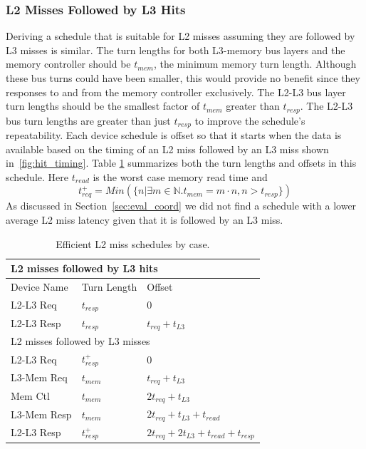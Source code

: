 \subsubsection{L2 Misses Followed by L3 Hits}
Deriving a schedule that is suitable for L2 misses assuming they are followed 
by L3 misses is similar. The turn lengths for both L3-memory bus layers and
the memory controller should be $t_{mem}$, the minimum memory turn length.
Although these bus turns could have been smaller, this would provide no
benefit since they responses to and from the memory controller exclusively.
The L2-L3 bus layer turn lengths should be
the smallest factor of $t_{mem}$ greater than $t_{resp}$. The L2-L3 bus turn 
lengths are greater than just $t_{resp}$ to improve the schedule's repeatability.
Each device schedule is offset so that it starts when the data is available 
based on the timing of an L2 miss followed by an L3 miss shown 
in~\ref{fig:hit_timing}. Table \ref{tab:l2_miss_schedules} summarizes both the
turn lengths and offsets in this schedule. Here $t_{read}$ is the worst case
memory read time and
\[
  t_{req}^+ = Min(\{n | \exists m\in \mathbb{N}.t_{mem}=m\cdot n, n > t_{resp}\})
\]
As discussed in Section~\ref{sec:eval_coord} we did not find a schedule with 
a lower average L2 miss latency given that it is followed by an L3 miss.

\def\dc{Blue}
\begin{table}
    \caption{Efficient L2 miss schedules by case.}
    \begin{small}
    \centering
    \begin{tabular}{|r|r|l|l|}
        \hline
        \multicolumn{4}{|l|}{L2 misses followed by L3 hits}\\\hline
        \multicolumn{2}{|l|}{Device Name} & Turn Length & Offset\\\hline
        \multicolumn{2}{|l|}{L2-L3 Req}  & $t_{resp}$ & 0\\\hline
        \multicolumn{2}{|l|}{L2-L3 Resp} & $t_{resp}$ &
          $t_{req}+t_{L3}$\\\hline\hline
        \multicolumn{4}{|l|}{L2 misses followed by L3 misses}\\\hline
        \multicolumn{2}{|l|}{L2-L3 Req}   & $t_{resp}^+$ & 0\\\hline
        \multicolumn{2}{|l|}{L3-Mem Req}  & $t_{mem}$ & $t_{req}+t_{L3}$\\\hline
        \multicolumn{2}{|l|}{Mem Ctl}     & $t_{mem}$ & $2t_{req}+t_{L3}$\\\hline
        \multicolumn{2}{|l|}{L3-Mem Resp} & $t_{mem}$ & 
          $2t_{req}+t_{L3}+t_{read}$\\\hline
        \multicolumn{2}{|l|}{L2-L3 Resp}  & $t_{resp}^+$ &
          $2t_{req}+2t_{L3}+t_{read}+t_{resp}$\\\hline
    \end{tabular}
    \end{small}
    \label{tab:l2_miss_schedules}
\end{table}

